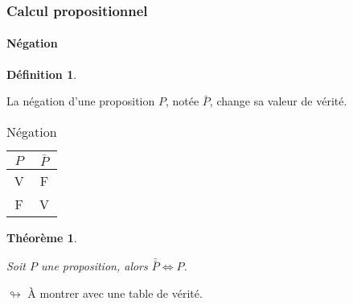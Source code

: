 \documentclass[10pt,notheorems]{beamer}
\theoremstyle{plain}
\newtheorem{theorem}{Théorème}
\theoremstyle{definition} %
\newtheorem{definition}{Définition}
\begin{document}

\begin{frame}
  \frametitle{Calcul propositionnel}
  \framesubtitle{Négation}
  \hypertarget{slide_negation}{}

  \begin{definition}\label{definition:negation}

    La négation d'une proposition $P$, notée $\bar P$, change sa
    valeur de vérité.
  \end{definition}

  \bigskip

  \begin{table}[H]

    \centering
    \begin{tabular}[H]{|c|c|}
      \hline
      $P$ & $\bar P$\\ \hline
      V & F \\
      F & V \\
      \hline\hline
    \end{tabular}
    \caption{Négation}
    \label{tab:negation}
  \end{table}

  \begin{theorem}\label{theorem:negation}

    Soit $P$ une proposition, alors
    $\bar{\bar P} \Leftrightarrow P$.
  \end{theorem}

  \medskip

  $\looparrowright$ À montrer avec une table de vérité.
\end{frame}


\end{document}
